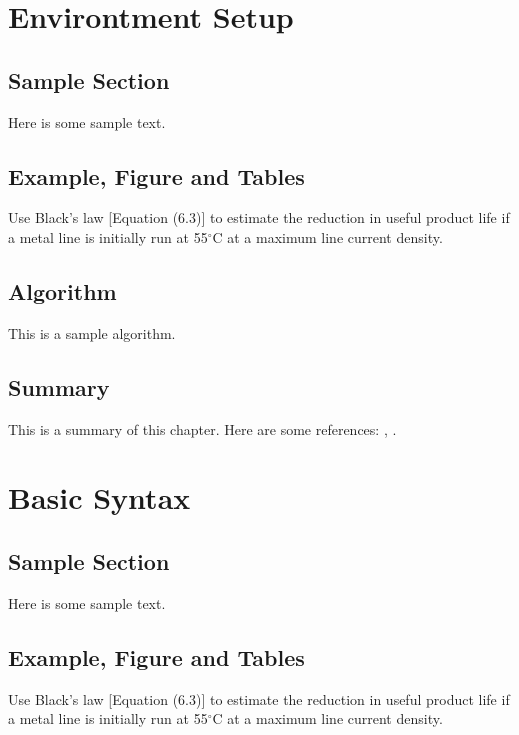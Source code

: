 \documentclass{wileySix}
\begin{document}
\chapter{Environtment Setup}

\section{Sample Section}
Here is some sample text.

\section{Example, Figure and Tables}
\vskip6pt
\begin{example}
	Use Black's law [Equation (6.3)] to estimate the reduction in useful product
	life if a metal line is initially run at 55$^\circ$C at a maximum line
	current density.
\end{example}

\section{Algorithm}
This is a sample algorithm.

\section{Summary}
This is a summary of this chapter.
Here are some references: \cite{xkilby}, \cite{xberen}.

\chapter{Basic Syntax}

\section{Sample Section}
Here is some sample text.

\section{Example, Figure and Tables}
\vskip6pt
\begin{example}
	Use Black's law [Equation (6.3)] to estimate the reduction in useful product
	life if a metal line is initially run at 55$^\circ$C at a maximum line
	current density.
\end{example}
\end{document}
